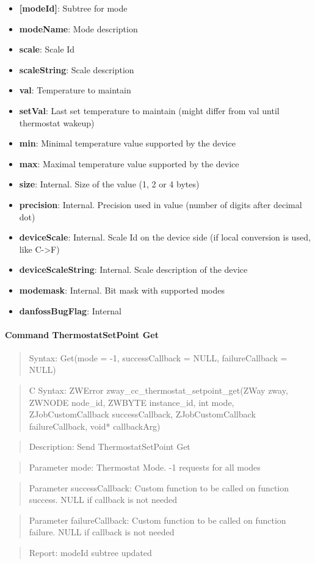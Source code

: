 \begin{itemize}
\item \textbf{[modeId]}: Subtree for mode
\item \qquad\textbf{modeName}: Mode description
\item \qquad\textbf{scale}: Scale Id
\item \qquad\textbf{scaleString}: Scale description
\item \qquad\textbf{val}: Temperature to maintain
\item \qquad\textbf{setVal}: Last set temperature to maintain (might differ from val until thermostat wakeup)
\item \qquad\textbf{min}: Minimal temperature value supported by the device
\item \qquad\textbf{max}: Maximal temperature value supported by the device
\item \qquad\textbf{size}: Internal. Size of the value (1, 2 or 4 bytes)
\item \qquad\textbf{precision}: Internal. Precision used in value (number of digits after decimal dot)
\item \qquad\textbf{deviceScale}: Internal. Scale Id on the device side (if local conversion is used, like C->F)
\item \qquad\textbf{deviceScaleString}: Internal. Scale description of the device
\item \textbf{modemask}: Internal. Bit mask with supported modes
\item \textbf{danfossBugFlag}: Internal
\end{itemize}

\paragraph{Command ThermostatSetPoint Get}
\begin{quote}Syntax: Get(mode = -1, successCallback = NULL, failureCallback = NULL)\end{quote}
\begin{quote}C Syntax: ZWError zway\_cc\_thermostat\_setpoint\_get(ZWay zway, ZWNODE node\_id, ZWBYTE instance\_id, int mode, ZJobCustomCallback successCallback, ZJobCustomCallback failureCallback, void* callbackArg)\end{quote}
\begin{quote}Description: Send ThermostatSetPoint Get\end{quote}
\begin{quote}Parameter mode: Thermostat Mode. -1 requests for all modes\end{quote}
\begin{quote}Parameter successCallback: Custom function to be called on function success. NULL if callback is not needed\end{quote}
\begin{quote}Parameter failureCallback: Custom function to be called on function failure. NULL if callback is not needed\end{quote}
\begin{quote}Report: modeId subtree updated\end{quote}


